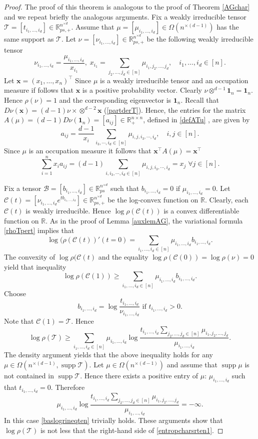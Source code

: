 \documentclass{amsart}
\newcommand{\supp}[1]{\operatorname{supp}{#1}}
\newcommand{\R}{\mathbb{R}}
\newcommand{\x}{\mathbf{x}}
\newcommand{\0}{\mathbf{0}}
\newcommand{\1}{\mathbf{1}}
\newcommand{\cB}{\mathcal{B}}
\newcommand{\cC}{\mathcal{C}}
\newcommand{\cT}{\mathcal{T}}
\newcommand{\trans}{^\top}
\theoremstyle{remark}
\numberwithin{equation}{section} %
\renewcommand{\ge}{\geqslant}
\begin{document}
\begin{proof}  The proof of this theorem is analogous to the proof of Theorem \ref{AGchar} and we repeat briefly the analogous arguments.  Fix a weakly irreducible tensor $\cT=[t_{i_1,\ldots,i_d}]\in \R_{ps,+}^{n^{\times d}}$.  Assume that $\mu=[\mu_{i_1,\ldots,i_d}]\in \Omega(n^{\times(d-1)})$ has the same support as $\cT$.  Let $\nu=[\nu_{i_1,\ldots,i_d}]\in\R_{ps,+}^{n^{\times d}}$ be the following weakly irreducible tensor
\[\nu_{i_1,\ldots,i_d}=\frac{\mu_{i_1,\ldots,i_d}}{x_{i_1}}, \;x_{i_1}={\sum_{j_2,\ldots,j_d\in[n]}\mu_{i_1,j_2,\ldots,j_d}}, \quad i_1,\ldots,i_d\in[n].\]
Let $\x=(x_1,\ldots,x_n)\trans $  Since $\mu$ is a weakly irreducible tensor and an occupation measure if follows that $\x$ is a positive probability vector. 
Clearly $\nu\otimes^{d-1}\1_n=\1_n$.  Hence $\rho(\nu)=1$ and the corresponding eigenvector is $\1_n$.  Recall that $D\nu(\x)=(d-1) \nu\times \otimes^{d-2} \x$ (\eqref{partderT}).  Hence, the entries for the matrix $A(\mu)=(d-1)D\nu(\1_n)=[a_{ij}]\in\R_+^{n\times n}$, defined in \eqref{defATu} , are given by
\[a_{ij}=\frac{d-1}{x_i}\sum_{i_3,\cdots,i_d\in[n]}\mu_{i,j,i_3,\cdots,i_d}, \quad i,j\in[n].\]
Since $\mu$ is an occupation measure it follows that $\x\trans A(\mu)=\x\trans$
\[\sum_{i=1}^n x_i a_{ij}=(d-1)\sum_{i,i_3,\cdots,i_d\in[n]}\mu_{i,j,i_3,\cdots,i_d}=x_j \;\forall j\in[n].\]

Fix a tensor $\cB=[b_{i_1,\ldots,i_d}]\in\R_{ps}^{n^{\times d}}$ such that $b_{i_1,\ldots,i_d}=0$ if $\mu_{i_1,\ldots,i_d}=0$.  Let $\cC(t)=[\nu_{i_1,\ldots,i_d}e^{tb_{i_1,\ldots,i_d}}]\in\R_{ps,+}^{n^{\times d}}$ be the log-convex function on $\R$.  Clearly, each $\cC(t)$ is weakly irreducible. 
Hence $\log\rho(\cC(t))$ is a convex differentiable function on $\R$.  As in the proof of Lemma \ref{auxlemAG}, the variational formula \eqref{rhoTpert} implies that 
\[\log(\rho(\cC(t))'(t=0)= \sum_{i_1,\ldots,i_d\in[n]} \mu_{i_1,\ldots,i_d}b_{i_1,\ldots,i_d}.\]
The convexity of $\log\rho(\cC(t)$ and the equality $\log\rho(\cC(0))=\log\rho(\nu)=0$ yield that inequality 
\[\log\rho(\cC(1))\ge \sum_{i_1,\ldots,i_d\in[n]} \mu_{i_1,\ldots,i_d}b_{i_1,\ldots,i_d}.\]
Choose 
\[b_{i_1,\ldots,i_d}=\log\frac{t_{i_1,\ldots,i_d}}{\nu_{i_1,\ldots,i_d}} \textrm{ if } t_{i_1,\ldots,i_d}>0.\] 
Note that $\cC(1)=\cT$.  Hence 
\begin{equation}\label{baslogrineqten}
\log\rho(\cT)\ge \sum_{i_1,\ldots,i_d\in[n]}\mu_{i_1,\ldots,i_d}\log\frac{t_{i_1,\ldots,i_d}\sum_{j_2,\ldots,j_d\in[n]} \mu_{i_1,j_2,\ldots,j_d}}{\mu_{i_1,\ldots,i_d}}.
\end{equation}
The density argument yields that the above inequality holds for any $\mu\in\Omega(n^{\times(d-1)},\supp \cT)$.  Let $\mu\in\Omega(n^{\times(d-1)})$ and assume that $\supp \mu$ is not contained in $\supp \cT$.   Hence there exists a positive entry of $\mu$:  $\mu_{i_1,\ldots,i_d}$ such that $t_{i_1,\ldots,i_d}=0$.   Therefore 
\[\mu_{i_1,\ldots,i_d}\log\frac{t_{i_1,\ldots,i_d}\sum_{j_2,\ldots,j_d\in[n]} \mu_{i_1,j_2,\ldots,j_d}}{\mu_{i_1,\ldots,i_d}}=-\infty.\]
In this case \eqref{baslogrineqten} trivially holds.  These arguments show that $\log\rho(\cT)$ is not less that the right-hand side of \eqref{entropcharsrten1}.


\end{proof}
\end{document}
